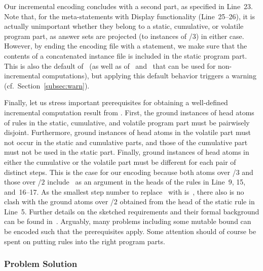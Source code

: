 Our incremental encoding concludes with a second  part,
as specified in Line~23.
Note that, for the meta-statements with Display functionality (Line~25--26),
it is actually unimportant whether they belong to a static, cumulative, or
volatile program part, as answer sets are projected
(to instances of /$3$) in either case.
However, by ending the encoding file with a  statement,
we make sure that the contents of a concatenated instance file
is included in the static program part.
This is also the default of \iclingo\
(as well as of \gringo\ and \clingo\ that can be used for non-incremental computations),
but applying this default behavior triggers a warning (cf.\ Section~\ref{subsec:warn}).%

Finally, let us stress important prerequisites for obtaining
a well-defined incremental computation result from \iclingo.
First, the ground instances of head atoms of rules in the
static, cumulative, and volatile program part must be pairwisely disjoint.
Furthermore, ground instances of head atoms in the volatile part
must not occur in the static and cumulative parts,
and those of the cumulative part must not be used in the static part.
Finally, ground instances of head atoms in either the cumulative or the volatile part
must be different for each pair of distinct steps.
This is the case for our encoding because both atoms over \pred{move}/$3$
and those over \pred{holds}/$2$ include~ as an argument in the
heads of the rules in Line~9, 15, and~16--17.
As the smallest step number to replace~\const{t} with is~\const{1},
there also is no clash with the ground atoms over /$2$
obtained from the head of the static rule in Line~5.
Further details on the sketched requirements and their formal background can
be found in~\cite{gekakaosscth08a}.
Arguably, many problems including some mutable bound can be encoded
such that the prerequisites apply.
Some attention should of course be spent on
putting rules into the right program parts.


\subsubsection{Problem Solution}\label{subsec:block:solution}

